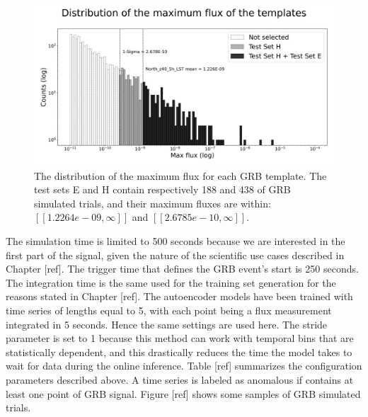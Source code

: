 
\begin{figure}[t]
\centering
\includegraphics[width=1\textwidth]{figures/experiments/templates_max_flux_distributions.png}
\caption{The distribution of the maximum flux for each GRB template. The test sets E and H contain respectively 188  and 438 of GRB simulated trials, and their maximum fluxes are within: $[[1.2264e-09, \infty]]$ and $[[2.6785e-10, \infty]]$.}
\label{f:exp-max-flux-distribution-E}
\end{figure}


The simulation time is limited to 500 seconds because we are interested in the first part of the signal, given the nature of the scientific use cases described in Chapter [ref]. The trigger time that defines the GRB event's start is 250 seconds. The integration time is the same used for the training set generation for the reasons stated in Chapter [ref]. The autoencoder models have been trained with time series of lengths equal to 5, with each point being a flux measurement integrated in 5 seconds. Hence the same settings are used here. The stride parameter is set to 1 because this method can work with temporal bins that are statistically dependent, and this drastically reduces the time the model takes to wait for data during the online inference. Table [ref] summarizes the configuration parameters described above. A time series is labeled as anomalous if contains at least one point of GRB signal. Figure [ref] shows some samples of GRB simulated trials.  



